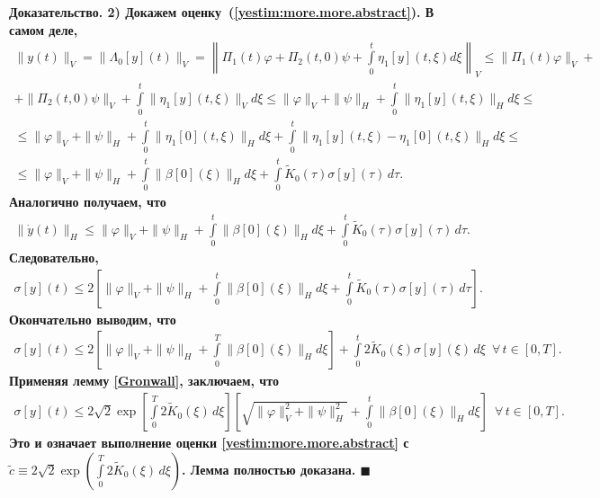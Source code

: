 \documentclass{report}
\newenvironment{Proof}{\par\noindent\bf Доказательство.\rm}{ $\blacksquare$\par}
\begin{document}
\begin{Proof}
2) Докажем оценку~(\ref{yestim:more.more.abstract}). В самом деле,
\begin{gather*}
\|y(t)\|_V=\|\Lambda_0[y](t)\|_V= \left\|\Pi_1(t)\varphi+\Pi_2(t,0)\psi+\int\limits_0^t\eta_1[y](t,\xi)d\xi\right\|_V\leqslant\|\Pi_1(t)\varphi\|_V+\\
+\|\Pi_2(t,0)\psi\|_V+\int\limits_0^t\|\eta_1[y](t,\xi)\|_Vd\xi\leqslant \|\varphi\|_V+\|\psi\|_H+\int\limits_0^t\|\eta_1[y](t,\xi)\|_Hd\xi\leqslant\\
\leqslant\|\varphi\|_V+\|\psi\|_H+\int\limits_0^t\|\eta_1[0](t,\xi)\|_Hd\xi+\int\limits_0^t\|\eta_1[y](t,\xi)-\eta_1[0](t,\xi)\|_Hd\xi\leqslant\\
\leqslant\|\varphi\|_V+\|\psi\|_H+\int\limits_0^t\|\beta[0](\xi)\|_Hd\xi+\int\limits_0^t\tilde{K}_0(\tau)\sigma[y](\tau)\,d\tau.
\end{gather*}
Аналогично получаем, что
\begin{gather*}
\|\dot y(t)\|_H\leqslant\|\varphi\|_V+\|\psi\|_H+\int\limits_0^t\|\beta[0](\xi)\|_Hd\xi+\int\limits_0^t\tilde{K}_0(\tau)\sigma[y](\tau)\,d\tau.
\end{gather*}
Следовательно,
\begin{gather*}
\sigma[y](t)\leqslant{2}\left[\|\varphi\|_V+\|\psi\|_H+\int\limits_0^t\|\beta[0](\xi)\|_Hd\xi+\int\limits_0^t\tilde{K}_0(\tau)\sigma[y](\tau)\,d\tau\right].
\end{gather*}
Окончательно выводим, что
\begin{gather*}
\sigma[y](t)\leqslant 2\left[\|\varphi\|_V+\|\psi\|_H+\int\limits_0^T\|\beta[0](\xi)\|_Hd\xi\right]+\int\limits_0^t2\tilde K_0(\xi)\sigma[y](\xi)\,d\xi \,\,\,\forall\,t\in[0,T].
\end{gather*}
Применяя лемму \ref{Gronwall}, заключаем, что
\begin{gather*}
\sigma[y](t)\leqslant2\sqrt{2}\exp\left[\int\limits_{0}^T2\tilde{K}_0(\xi)\,d\xi\right] \left[\sqrt{\|\varphi\|_V^2+\|\psi\|_H^2}+\int\limits_0^t\|\beta[0](\xi)\|_Hd\xi\right]\,\,\,
\forall\,t\in[0,T].
\end{gather*}
Это и означает выполнение оценки \eqref{yestim:more.more.abstract} с $\tilde c\equiv 2\sqrt2\exp(\int\limits_{0}^T2\tilde{K}_0(\xi)\,d\xi)$.  Лемма полностью доказана.
\end{Proof}
\end{document}
